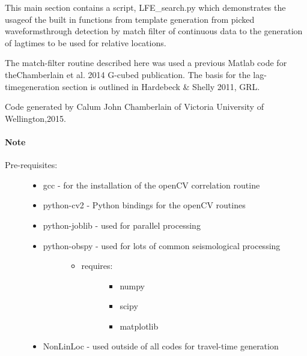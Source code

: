 \documentclass[a4paper,10pt,english]{sphinxmanual}
\begin{document}
This main section contains a script, LFE\_search.py which demonstrates the usageof the built in functions from template generation from picked waveformsthrough detection by match filter of continuous data to the generation of lagtimes to be used for relative locations.

The match-filter routine described here was used a previous Matlab code for theChamberlain et al. 2014 G-cubed publication.  The basis for the lag-timegeneration section is outlined in Hardebeck \& Shelly 2011, GRL.

Code generated by Calum John Chamberlain of Victoria University of Wellington,2015.
\paragraph{Note}
\begin{description}
\item[{Pre-requisites:}] \leavevmode\begin{itemize}
\item {} 
gcc             - for the installation of the openCV correlation routine

\item {} 
python-cv2      - Python bindings for the openCV routines

\item {} 
python-joblib   - used for parallel processing

\item {} \begin{description}
\item[{python-obspy    - used for lots of common seismological processing}] \leavevmode\begin{itemize}
\item {} \begin{description}
\item[{requires:}] \leavevmode\begin{itemize}
\item {} 
numpy

\item {} 
scipy

\item {} 
matplotlib

\end{itemize}

\end{description}

\end{itemize}

\end{description}

\item {} 
NonLinLoc       - used outside of all codes for travel-time generation

\end{itemize}

\end{description}
\end{document}
